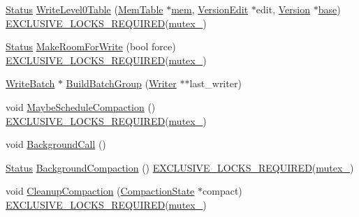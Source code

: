\begin{DoxyCompactItemize}
\item 
\hyperlink{classleveldb_1_1_status}{Status} \hyperlink{classleveldb_1_1_d_b_impl_a6b1b87947df08e63ea9389722f943943}{Write\-Level0\-Table} (\hyperlink{classleveldb_1_1_mem_table}{Mem\-Table} $\ast$\hyperlink{db__impl_8cc_a1a1fa02d49bbc4c0896ff1cb12618dc3}{mem}, \hyperlink{classleveldb_1_1_version_edit}{Version\-Edit} $\ast$edit, \hyperlink{classleveldb_1_1_version}{Version} $\ast$\hyperlink{testharness_8cc_a70ff0f6c026c3dd1ef6aaf504e7fddc3}{base}) \hyperlink{thread__annotations_8h_a0e2e86b0f11d9778240b0a0b263047b1}{E\-X\-C\-L\-U\-S\-I\-V\-E\-\_\-\-L\-O\-C\-K\-S\-\_\-\-R\-E\-Q\-U\-I\-R\-E\-D}(\hyperlink{classleveldb_1_1_d_b_impl_ac591585d5dea970b4bd1beb7553ce197}{mutex\-\_\-})
\item 
\hyperlink{classleveldb_1_1_status}{Status} \hyperlink{classleveldb_1_1_d_b_impl_a9439d7de053315f2f2b59c6382db6f9b}{Make\-Room\-For\-Write} (bool force) \hyperlink{thread__annotations_8h_a0e2e86b0f11d9778240b0a0b263047b1}{E\-X\-C\-L\-U\-S\-I\-V\-E\-\_\-\-L\-O\-C\-K\-S\-\_\-\-R\-E\-Q\-U\-I\-R\-E\-D}(\hyperlink{classleveldb_1_1_d_b_impl_ac591585d5dea970b4bd1beb7553ce197}{mutex\-\_\-})
\item 
\hyperlink{classleveldb_1_1_write_batch}{Write\-Batch} $\ast$ \hyperlink{classleveldb_1_1_d_b_impl_a9e6ce4d7fffcf59575053f7d5c5e886b}{Build\-Batch\-Group} (\hyperlink{structleveldb_1_1_d_b_impl_1_1_writer}{Writer} $\ast$$\ast$last\-\_\-writer)
\item 
void \hyperlink{classleveldb_1_1_d_b_impl_a91134e3ca9d5c6220dd45f19d461a831}{Maybe\-Schedule\-Compaction} () \hyperlink{thread__annotations_8h_a0e2e86b0f11d9778240b0a0b263047b1}{E\-X\-C\-L\-U\-S\-I\-V\-E\-\_\-\-L\-O\-C\-K\-S\-\_\-\-R\-E\-Q\-U\-I\-R\-E\-D}(\hyperlink{classleveldb_1_1_d_b_impl_ac591585d5dea970b4bd1beb7553ce197}{mutex\-\_\-})
\item 
void \hyperlink{classleveldb_1_1_d_b_impl_a0b9829a3bc7b5a119819c6b04b557ab0}{Background\-Call} ()
\item 
\hyperlink{classleveldb_1_1_status}{Status} \hyperlink{classleveldb_1_1_d_b_impl_af8d8c2abc99da12f82a594b6a7d43e35}{Background\-Compaction} () \hyperlink{thread__annotations_8h_a0e2e86b0f11d9778240b0a0b263047b1}{E\-X\-C\-L\-U\-S\-I\-V\-E\-\_\-\-L\-O\-C\-K\-S\-\_\-\-R\-E\-Q\-U\-I\-R\-E\-D}(\hyperlink{classleveldb_1_1_d_b_impl_ac591585d5dea970b4bd1beb7553ce197}{mutex\-\_\-})
\item 
void \hyperlink{classleveldb_1_1_d_b_impl_ac92ebc16dda9d49a3e4cf085f5798c54}{Cleanup\-Compaction} (\hyperlink{structleveldb_1_1_d_b_impl_1_1_compaction_state}{Compaction\-State} $\ast$compact) \hyperlink{thread__annotations_8h_a0e2e86b0f11d9778240b0a0b263047b1}{E\-X\-C\-L\-U\-S\-I\-V\-E\-\_\-\-L\-O\-C\-K\-S\-\_\-\-R\-E\-Q\-U\-I\-R\-E\-D}(\hyperlink{classleveldb_1_1_d_b_impl_ac591585d5dea970b4bd1beb7553ce197}{mutex\-\_\-})
$$
\end{DoxyCompactItemize}
